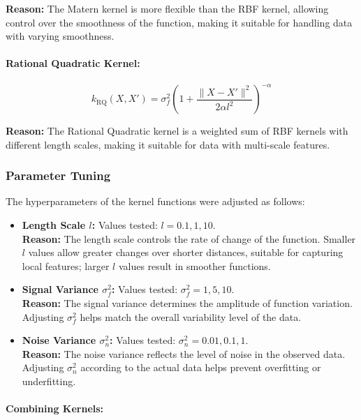 \documentclass[11pt]{article}
\begin{document}
\textbf{Reason:} The Matern kernel is more flexible than the RBF kernel, allowing control over the smoothness of the function, making it suitable for handling data with varying smoothness.

\paragraph{Rational Quadratic Kernel:}

\[
k_{\text{RQ}}(X, X') = \sigma_f^2 \left(1 + \frac{\| X - X' \|^2}{2 \alpha l^2} \right)^{-\alpha}
\]

\textbf{Reason:} The Rational Quadratic kernel is a weighted sum of RBF kernels with different length scales, making it suitable for data with multi-scale features.

\subsubsection{Parameter Tuning}

The hyperparameters of the kernel functions were adjusted as follows:

\begin{itemize}
    \item \textbf{Length Scale $l$:} Values tested: $l = 0.1, 1, 10$. \\
    \textbf{Reason:} The length scale controls the rate of change of the function. Smaller $l$ values allow greater changes over shorter distances, suitable for capturing local features; larger $l$ values result in smoother functions.
    
    \item \textbf{Signal Variance $\sigma_f^2$:} Values tested: $\sigma_f^2 = 1, 5, 10$. \\
    \textbf{Reason:} The signal variance determines the amplitude of function variation. Adjusting $\sigma_f^2$ helps match the overall variability level of the data.
    
    \item \textbf{Noise Variance $\sigma_n^2$:} Values tested: $\sigma_n^2 = 0.01, 0.1, 1$. \\
    \textbf{Reason:} The noise variance reflects the level of noise in the observed data. Adjusting $\sigma_n^2$ according to the actual data helps prevent overfitting or underfitting.
\end{itemize}

\paragraph{Combining Kernels:}
\end{document}
